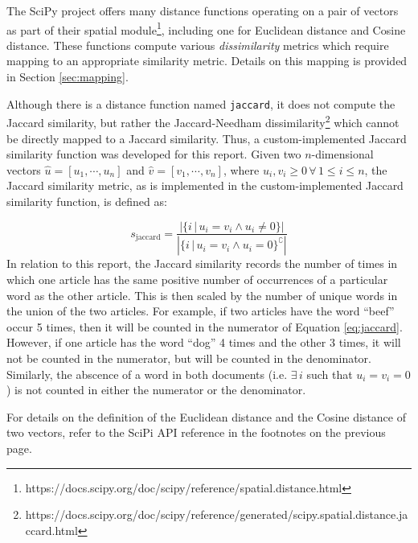 \documentclass[11pt]{article}
\begin{document}
The SciPy project offers many distance functions operating on a pair of vectors as part of their spatial module\footnote{
https://docs.scipy.org/doc/scipy/reference/spatial.distance.html
}, including one for Euclidean distance %
and Cosine distance. %
These functions compute various \emph{dissimilarity} metrics which require mapping to an appropriate similarity metric.
Details on this mapping is provided in Section \ref{sec:mapping}.

Although there is a distance function named \texttt{jaccard}, it does not compute the Jaccard similarity, but rather the Jaccard-Needham dissimilarity\footnote{
https://docs.scipy.org/doc/scipy/reference/generated/scipy.spatial.distance.jaccard.html
} which cannot be directly mapped to a Jaccard similarity.
Thus, a custom-implemented Jaccard similarity function was developed for this report.
Given two $n$-dimensional vectors $\hat{u} = [ u_1, \cdots, u_n ]$ and $\hat{v} = [ v_1, \cdots, v_n ]$, where $u_i, v_i \ge 0 \, \forall \, 1 \le i \le n$, the Jaccard similarity metric, as is implemented in the custom-implemented Jaccard similarity function, is defined as:

\begin{equation} \label{eq:jaccard}
	s_{\text{jaccard}} = \frac{ \left| \{i \, | \, u_i = v_i \land u_i \ne 0 \} \right| }
	                          { \left| \{i \, | \, u_i = v_i \land u_i = 0 \}^\complement \right| }
\end{equation}
In relation to this report, the Jaccard similarity records the number of times in which one article has the same positive number of occurrences of a particular word as the other article.
This is then scaled by the number of unique words in the union of the two articles. For example, if two articles have the word ``beef'' occur 5 times, then it will be counted in the numerator of Equation \ref{eq:jaccard}.
However, if one article has the word ``dog'' 4 times and the other 3 times, it will not be counted in the numerator, but will be counted in the denominator.
Similarly, the abscence of a word in both documents (i.e. $\exists \, i$ such that $u_i = v_i = 0$) is not counted in either the numerator or the denominator.

For details on the definition of the Euclidean distance and the Cosine distance of two vectors, refer to the SciPi API reference in the footnotes on the previous page.
\end{document}
